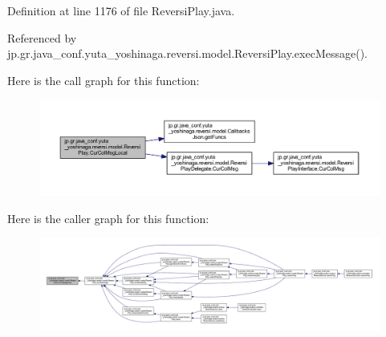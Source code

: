 Definition at line 1176 of file Reversi\+Play.\+java.



Referenced by jp.\+gr.\+java\+\_\+conf.\+yuta\+\_\+yoshinaga.\+reversi.\+model.\+Reversi\+Play.\+exec\+Message().

Here is the call graph for this function\+:
\nopagebreak
\begin{figure}[H]
\begin{center}
\leavevmode
\includegraphics[width=350pt]{classjp_1_1gr_1_1java__conf_1_1yuta__yoshinaga_1_1reversi_1_1model_1_1_reversi_play_a0dec187d4c4372a3470fac8e341ae9e8_cgraph}
\end{center}
\end{figure}
Here is the caller graph for this function\+:
\nopagebreak
\begin{figure}[H]
\begin{center}
\leavevmode
\includegraphics[width=350pt]{classjp_1_1gr_1_1java__conf_1_1yuta__yoshinaga_1_1reversi_1_1model_1_1_reversi_play_a0dec187d4c4372a3470fac8e341ae9e8_icgraph}
\end{center}
\end{figure}
\mbox{\label{classjp_1_1gr_1_1java__conf_1_1yuta__yoshinaga_1_1reversi_1_1model_1_1_reversi_play_a4c4d14ddaf65d3643bd7edc7b562f4d1}} 
